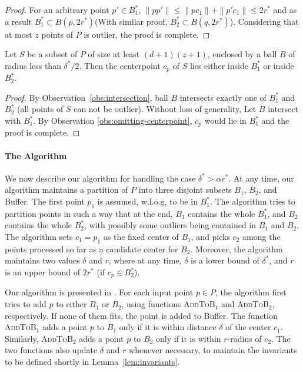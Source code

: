 \documentclass[envcountsame]{cls/cccg15}
\newcommand{\rc}{r}
\newcommand{\dz}{(d + 1)(z + 1)}
\newcommand{\textproc}{\textsc}
\newcommand{\len}[1]{\|{#1}\|}
\newcommand{\lee}{\leqslant}
\renewcommand{\leq}{\lee}
\begin{document}
\begin{proof}
	For an arbitrary point $p' \in B_1^*$, $\len{pp'} \leq \len{pc_1} + \len{p'c_1} \leq 2r^*$ and as a result $B_1^* \subset B(p, 2r^*)$(With similar proof, $B_2^* \subset B(q, 2r^*)$).  Considering that at most $z$ points of $P$ is outlier,  the proof is complete.
\end{proof}

\begin{lemma}
\label{lem:center-point}
	Let $S$ be a subset of $P$ of size at least $\dz$,
	enclosed by a ball $B$ of radius less than $\delta^* / 2$.
	Then the centerpoint $c_p$ of $S$ lies either inside $B_1^{*}$ or inside $B_2^{*}$.
\end{lemma}

\begin{proof}
	By Observation~\ref{obs:intersection}, ball $B$ intersects exactly one of $B_1^*$ and $B_2^*$ (all points of $S$ can not be outlier). Without loss of generality, Let $B$ intersect with $B_1^*$. By Observation \ref{obs:omitting-centerpoint}, $c_p$ would lie in $B_1^*$ and the proof is complete.
\end{proof}

\paragraph{The Algorithm}
We now describe our algorithm for handling the case  $\delta^* > \alpha r^*$.
At any time, our algorithm maintains a partition of $P$ into three disjoint subsets
$B_1$, $B_2$, and Buffer.
The first point $p_1$ is assumed, w.l.o.g, to be in $B_1^*$. 
The algorithm tries to partition points in such a way that 
at the end,
$B_1$ contains the whole $B_1^*$, and $B_2$ contains the whole $B_2^*$,
with possibly some outliers being contained in $B_1$ and $B_2$.
The algorithm sets $c_1 = p_1$ as the fixed center of $B_1$,
and picks $c_2$ among the points processed so far as a candidate center for $B_2$.
Moreover, the algorithm maintains two values $\delta$ and $r$,
where at any time, $\delta$ is a lower bound of $\delta^*$, 
and $r$ is an upper bound of $2r^*$ (if $c_p \in B_2^*$).

Our algorithm is presented in .
For each input point $p \in P$, the algorithm first tries 
to add $p$ to either $B_1$ or $B_2$,
using functions \textproc{AddToB$_1$} and \textproc{AddToB$_2$}, respectively.
If none of them fits, the point is added to Buffer.
The function \textproc{AddToB$_1$} adds a point $p$ to $B_1$
only if it is within distance $\delta$ of the center $c_1$.
Similarly, \textproc{AddToB$_2$} adds a point $p$ to $B_2$
only if it is within $\rc$-radius of $c_2$. 
The two functions also update $\delta$ and $\rc$ whenever necessary,
to maintain the invariants to be defined shortly in Lemma~\ref{lem:invariants}.
\end{document}
